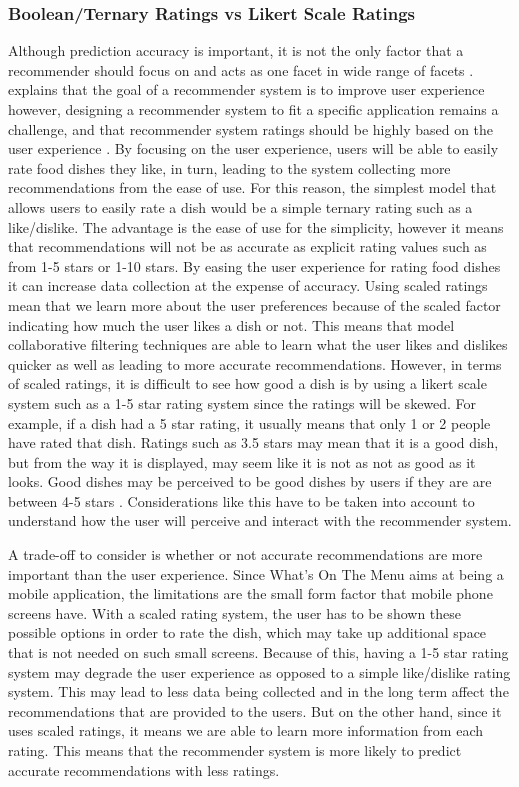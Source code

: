 \subsubsection{Boolean/Ternary Ratings vs Likert Scale Ratings}

Although prediction accuracy is important, it is not the only factor that a recommender should focus on and acts as one facet in wide range of facets \cite{martin2009recsys}. \citeauthor{martin2009recsys} explains that the goal of a recommender system is to improve user experience however, designing a recommender system to fit a specific application remains a challenge, and that recommender system ratings should be highly based on the user experience \cite{martin2009recsys}. By focusing on the user experience, users will be able to easily rate food dishes they like, in turn, leading to the system collecting more recommendations from the ease of use. For this reason, the simplest model that allows users to easily rate a dish would be a simple ternary rating such as a like/dislike. The advantage is the ease of use for the simplicity, however it means that recommendations will not be as accurate as explicit rating values such as from 1-5 stars or 1-10 stars. By easing the user experience for rating food dishes it can increase data collection at the expense of accuracy. Using scaled ratings mean that we learn more about the user preferences because of the scaled factor indicating how much the user likes a dish or not. This means that model collaborative filtering techniques are able to learn what the user likes and dislikes quicker as well as leading to more accurate recommendations. However, in terms of scaled ratings, it is difficult to see how good a dish is by using a likert scale system such as a 1-5 star rating system since the ratings will be skewed. For example, if a dish had a 5 star rating, it usually means that only 1 or 2 people have rated that dish. Ratings such as 3.5 stars may mean that it is a good dish, but from the way it is displayed, may seem like it is not as not as good as it looks. Good dishes may be perceived to be good dishes by users if they are are between 4-5 stars \cite{recommendable}. Considerations like this have to be taken into account to understand how the user will perceive and interact with the recommender system.  

A trade-off to consider is whether or not accurate recommendations are more important than the user experience. Since What's On The Menu aims at being a mobile application, the limitations are the small form factor that mobile phone screens have. With a scaled rating system, the user has to be shown these possible options in order to rate the dish, which may take up additional space that is not needed on such small screens. Because of this, having a 1-5 star rating system may degrade the user experience as opposed to a simple like/dislike rating system. This may lead to less data being collected and in the long term affect the recommendations that are provided to the users. But on the other hand, since it uses scaled ratings, it means we are able to learn more information from each rating. This means that the recommender system is more likely to predict accurate recommendations with less ratings. 

